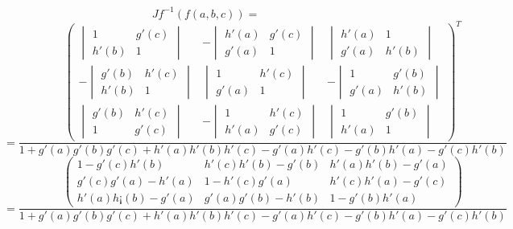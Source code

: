 \documentclass[12pt, a4papre]{article}
\begin{document}
	\[
	Jf^{-1}(f(a,b,c))=
	\]
	\[
	=
	\frac{
	\begin{pmatrix}
		\begin{vmatrix}
		1		&g'(c)\\
		h'(b)		&1
		\end{vmatrix}
		&
		-\begin{vmatrix}
		h'(a)		&g'(c)\\
		g'(a)		&1
		\end{vmatrix}
		&
		\begin{vmatrix}
		h'(a)		&1\\
		g'(a)		&h'(b)
		\end{vmatrix}\\
		-\begin{vmatrix}
		g'(b)		&h'(c)\\
		h'(b)		&1
		\end{vmatrix}
		&
		\begin{vmatrix}
		1		&h'(c)\\
		g'(a)		&1
		\end{vmatrix}
		&
		-\begin{vmatrix}
		1		&g'(b)\\
		g'(a)		&h'(b)
		\end{vmatrix}\\
		\begin{vmatrix}
		g'(b)		&h'(c)\\
		1		&g'(c)
		\end{vmatrix}
		&
		-\begin{vmatrix}
		1		&h'(c)\\
		h'(a)		&g'(c)
		\end{vmatrix}
		&
		\begin{vmatrix}
		1		&g'(b)\\
		h'(a)		&1
		\end{vmatrix}
	\end{pmatrix}^T
	}{
	1+g'(a)g'(b)g'(c)+h'(a)h'(b)h'(c)-g'(a)h'(c)-g'(b)h'(a)-g'(c)h'(b)
	}
	\]
	\[
	=
	\frac{
	\begin{pmatrix}
		1-g'(c)h'(b)	&h'(c)h'(b)-g'(b)		&h'(a)h'(b)-g'(a)\\
		g'(c)g'(a)-h'(a)	&1-h'(c)g'(a)		&h'(c)h'(a)-g'(c)\\
		h'(a)h¡(b)-g'(a)	&g'(a)g'(b)-h'(b)		&1-g'(b)h'(a)
	\end{pmatrix}
	}{
	1+g'(a)g'(b)g'(c)+h'(a)h'(b)h'(c)-g'(a)h'(c)-g'(b)h'(a)-g'(c)h'(b)
	}
	\]
	
\end{document}
